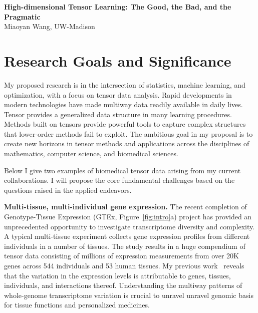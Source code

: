 \documentclass[11pt]{article}
\theoremstyle{exampstyle}
\theoremstyle{definition}
\begin{document}
 
\newpage
\setcounter{page}{1}
\begin{center}
{\bf \large High-dimensional Tensor Learning: The Good, the Bad, and the Pragmatic}\\

Miaoyan Wang, UW-Madison
\end{center}
\vspace{-.3cm}

\section{Research Goals and Significance}
\vspace{-.5cm}
My proposed research is in the intersection of statistics, machine learning, and optimization, with a focus on tensor data analysis. Rapid developments in modern technologies have made multiway data readily available in daily lives. Tensor provides a generalized data structure in many learning procedures. Methods built on tensors provide powerful tools to capture complex structures that lower-order methods fail to exploit. The ambitious goal in my proposal is to create new horizons in tensor methods and applications across the disciplines of mathematics, computer science, and biomedical sciences.  

\setlength{\abovedisplayskip}{6.5pt}
\setlength{\belowdisplayskip}{6pt}


Below I give two examples of biomedical tensor data arising from my current collaborations. I will propose the core fundamental challenges based on the questions raised in the applied endeavors.

{\bf Multi-tissue, multi-individual gene expression.} The recent completion of Genotype-Tissue Expression (GTEx, Figure~\ref{fig:intro}a) project has provided an unprecedented opportunity to investigate transcriptome diversity and complexity. A typical multi-tissue experiment collects gene expression profiles from different individuals in a number of tissues.  The study results in a huge compendium of tensor data consisting of millions of expression measurements from over 20K genes across 544 individuals and 53 human tissues. My previous work~\cite{wang2019three} reveals that the variation in the expression levels is attributable to genes, tissues, individuals, and interactions thereof. Understanding the multiway patterns of whole-genome transcriptome variation is crucial to unravel unravel genomic basis for tissue functions and personalized medicines.
\end{document}
